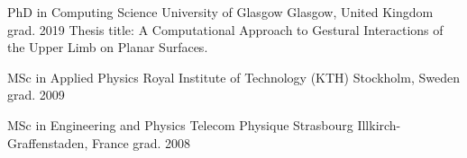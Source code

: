 

\begin{cventries}


  \cventry
    {PhD in Computing Science} %
    {University of Glasgow} %
    {Glasgow, United Kingdom} %
    {grad. 2019} %
    {Thesis title: A Computational Approach to Gestural Interactions of the Upper Limb on Planar Surfaces.}

  \cventry
    {MSc in Applied Physics} %
    {Royal Institute of Technology (KTH)} %
    {Stockholm, Sweden} %
    {grad. 2009} %
    {}

  \cventry
    {MSc in Engineering and Physics} %
    {Telecom Physique Strasbourg} %
    {Illkirch-Graffenstaden, France} %
    {grad. 2008} %
    {}

\end{cventries}
